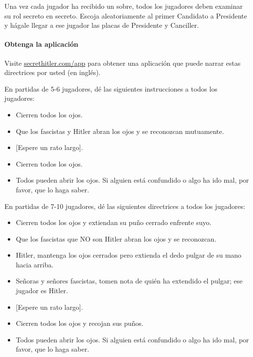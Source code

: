 \documentclass[13pt,a4paper,twocolumn,titlepage]{scrartcl}
\begin{document}
	Una vez cada jugador ha recibido un sobre, todos los jugadores deben examinar su rol secreto en secreto. Escoja aleatoriamente al primer Candidato a Presidente y hágale llegar a ese jugador las placas de Presidente y Canciller.
	
	\vspace*{-8mm}
	\paragraph{\textcolor{SeaGreen4}{Obtenga la aplicación}}
	\textcolor{SeaGreen4}{Visite \url{secrethitler.com/app} para obtener una aplicación que puede narrar estas directrices por usted (en inglés).}
	
	\textcolor{Blue3}{En partidas de 5-6 jugadores}, dé las siguientes instrucciones a todos los jugadores:
	\begin{itemize}
		\item Cierren todos los ojos.
		\item Que los \textcolor{fascist}{fascistas} y \textcolor{fascist}{Hitler} abran los ojos y se reconozcan mutuamente.
		\item $\phantom{}$[Espere un rato largo].
		\item Cierren todos los ojos.
		\item Todos pueden abrir los ojos. Si alguien está confundido o algo ha ido mal, por favor, que lo haga saber.
	\end{itemize}

		\textcolor{Blue3}{En partidas de 7-10 jugadores}, dé las siguientes directrices a todos los jugadores:
	\begin{itemize}
		\item Cierren todos los ojos y extiendan su puño cerrado enfrente suyo.
		\item Que los \textcolor{fascist}{fascistas} que NO son \textcolor{fascist}{Hitler} abran los ojos y se reconozcan.
		\item \textcolor{fascist}{Hitler}, mantenga los ojos cerrados pero extienda el dedo pulgar de su mano hacia arriba.
		\item Señoras y señores \textcolor{fascist}{fascistas}, tomen nota de quién ha extendido el pulgar; ese jugador es \textcolor{fascist}{Hitler}.
		\item $\phantom{}$[Espere un rato largo].
		\item Cierren todos los ojos y recojan sus puños.
		\item Todos pueden abrir los ojos. Si alguien está confundido o algo ha ido mal, por favor, que lo haga saber.
	\end{itemize}
	
\end{document}
